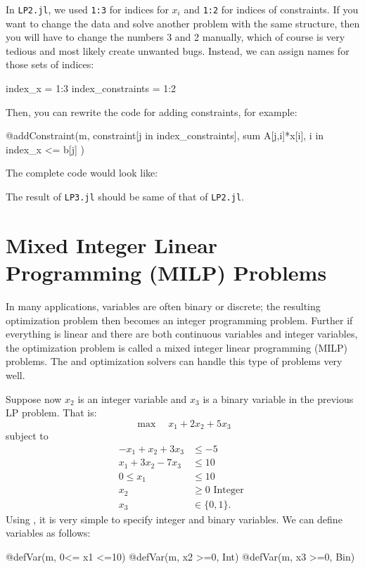 In \texttt{LP2.jl}, we used \texttt{1:3} for indices for $x_i$ and \texttt{1:2} for indices of constraints. If you want to change the data and solve another problem with the same structure, then you will have to change the numbers 3 and 2 manually, which of course is very tedious and most likely create unwanted bugs. Instead, we can assign names for those sets of indices:
\begin{code}
index_x = 1:3
index_constraints = 1:2
\end{code}
\noindent Then, you can rewrite the code for adding constraints, for example:
\begin{code}
@addConstraint(m, constraint[j in index_constraints],
                  sum{ A[j,i]*x[i], i in index_x } <= b[j] )
\end{code}
\noindent The complete code would look like:
\begin{codelisting}
\end{codelisting}

The result of \texttt{LP3.jl} should be same of that of \texttt{LP2.jl}.




\section{Mixed Integer Linear Programming (MILP) Problems}

In many applications, variables are often binary or discrete; the resulting optimization problem then becomes an integer programming problem. Further if everything is linear and there are both continuous variables and integer variables, the optimization problem is called a mixed integer linear programming (MILP) problems. The \gurobi{} and \cplex{} optimization solvers can handle this type of problems very well.

Suppose now $x_2$ is an integer variable and $x_3$ is a binary variable in the previous LP problem. That is:
\[
	\max \quad x_1 + 2x_2 + 5x_3
\]
subject to
\begin{align*}
-x_1 + x_2 + 3x_3 &\leq -5 \\
x_1 + 3x_2 - 7x_3 &\leq 10 \\
0 \leq x_1 &\leq 10 \\
x_2 &\geq 0 \text{ Integer }\\
x_3 &\in \{0, 1\} .
\end{align*}
Using \jump{}, it is very simple to specify integer and binary variables. We can define variables as follows:
\begin{code}
@defVar(m, 0<= x1 <=10)
@defVar(m, x2 >=0, Int)
@defVar(m, x3 >=0, Bin)
\end{code}

